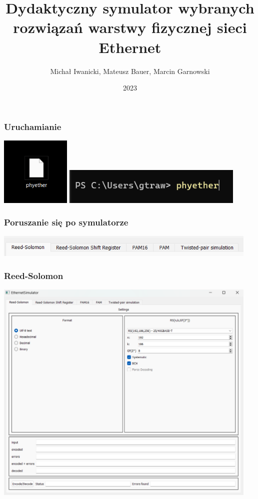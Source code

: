 \documentclass{beamer}
\title{\Large\textbf{Dydaktyczny symulator wybranych rozwiązań warstwy fizycznej sieci Ethernet}}
\author{Michał Iwanicki, Mateusz Bauer, Marcin Garnowski}
\institute{Politechnika Gdańska}
\date{2023}
\begin{document}
\frame{\titlepage}

\begin{frame}
\frametitle{Uruchamianie}
\includegraphics[width=0.25\textwidth]{images/prezentacja_start1.png}
\hfill
\includegraphics[width=0.65\textwidth]{images/prezentacja_start2.png}
\end{frame}

\begin{frame}
\frametitle{Poruszanie się po symulatorze}
\includegraphics[width=0.95\textwidth]{images/zakladki.png}
\end{frame}

\begin{frame}
\frametitle{Reed-Solomon}
\includegraphics[width=0.95\textwidth]{images/prezentacja_rs.png}
\end{frame}
\end{document}
